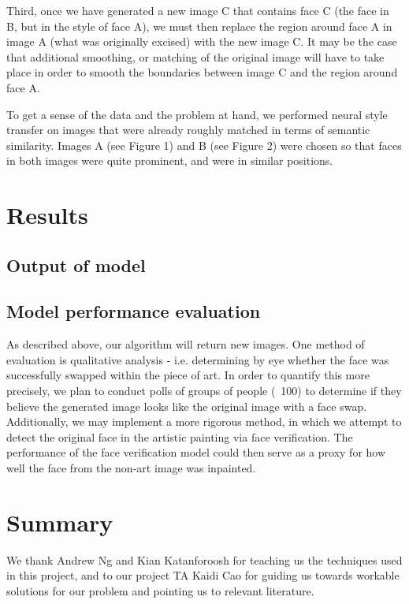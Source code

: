 \documentclass{pnastwo2}
\begin{document}
\begin{article}
Third, once we have generated a new image C that contains face C (the face in B, but in the style of face A), we must then replace the region around face A in image A (what was originally excised) with the new image C. It may be the case that additional smoothing, or matching of the original image will have to take place in order to smooth the boundaries between image C and the region around face A. 

To get a sense of the data and the problem at hand, we performed neural style transfer on images that were already roughly matched in terms of semantic similarity. Images A (see Figure 1) and B (see Figure 2) were chosen so that faces in both images were quite prominent, and were in similar positions.

\section{Results}

\subsection{Output of model}

\subsection{Model performance evaluation}

As described above, our algorithm will return new images. One method of evaluation is qualitative analysis - i.e. determining by eye whether the face was successfully swapped within the piece of art. In order to quantify this more precisely, we plan to conduct polls of groups of people (~100) to determine if they believe the generated image looks like the original image with a face swap. Additionally, we may implement a more rigorous method, in which we attempt to detect the original face in the artistic painting via face verification. The performance of the face verification model could then serve as a proxy for how well the face from the non-art image was inpainted.

\section{Summary}


\begin{acknowledgments}
We thank Andrew Ng and Kian Katanforoosh for teaching us the techniques used in this project, and to our project TA Kaidi Cao for guiding us towards workable solutions for our problem and pointing us to relevant literature.
\end{acknowledgments}




\end{article}
\end{document}
